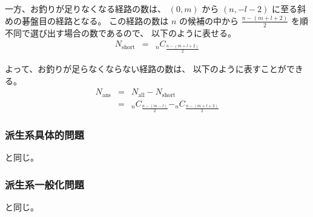 一方、お釣りが足りなくなる経路の数は、
$(0,m)$ から $(n,-l-2)$ に至る斜めの碁盤目の経路となる。
この経路の数は
$n$ の候補の中から $\frac{n - (m+l+2)}{2}$ を順不同で選び出す場合の数であるので、
以下のように表せる。
  \begin{eqnarray}
    N_{\text{short}} & = & _{n}C_{\frac{n - (m+l+2)}{2}}
  \end{eqnarray}

よって、お釣りが足らなくならない経路の数は、
以下のように表すことができる。
  \begin{eqnarray}
    N_{\text{ans}} & = & N_{\text{all}} - N_{\text{short}}
  \\
      & = & _{n}C_{\frac{n - (m-l)}{2}} - _{n}C_{\frac{n - (m+l+2)}{2}}
  \end{eqnarray}

\subsubsection{派生系具体的問題}
\label{sssec:お釣り:解答:派生系具体的問題}

と同じ。

\subsubsection{派生系一般化問題}
\label{sssec:お釣り:解答:派生系一般化問題}

と同じ。
  
